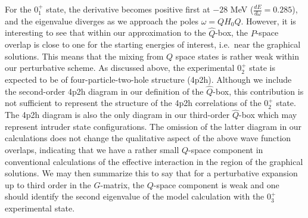 For the $0_1^+$ state, the derivative
becomes positive first at $-28$ MeV ($\frac{dE}{d\omega}=0.285$), and the
eigenvalue diverges as we approach the poles $\omega = QH_0Q$.
However, it is interesting to
see that within our approximation to the $\hat{Q}$-box,
the $P$-space overlap is close to one for the starting energies of
interest, i.e.\ near the graphical solutions. This means that
the mixing from $Q$ space states is rather weak within our perturbative
scheme. As discussed above, the experimental 
$0_2^+$ state is expected to be of
four-particle-two-hole structure (4p2h). 
Although we include the second-order 4p2h diagram in our definition
of the $\hat{Q}$-box,
this contribution is not sufficient to represent
the structure of the 4p2h correlations of the $0_2^+$ state. 
The 4p2h diagram
is also the only diagram in our third-order $\hat{Q}$-box which
may represent intruder state configurations.
The omission of the latter diagram in our calculations
does not change the qualitative
aspect of the above wave function overlaps, indicating that we have a
rather small $Q$-space component in conventional calculations
of the effective interaction in the region of the graphical solutions.
We may then summarize this to say
that for a perturbative expansion up to
third order in the $G$-matrix, the $Q$-space
component is weak and one should
identify the second eigenvalue of the model calculation with
the $0_3^+$ experimental state.

